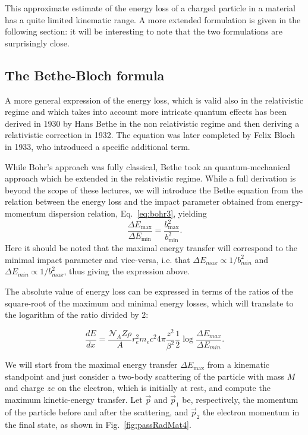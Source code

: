 This approximate estimate of the energy loss of a charged particle in a material has a quite limited kinematic range. A more extended formulation is given in the following section: it will be interesting to note that the two formulations are surprisingly close.

\subsection{The Bethe-Bloch formula}
A more general expression of the energy loss, which is valid also in the relativistic regime and which takes into account more intricate quantum effects has been derived in 1930 by Hans Bethe in the non relativistic regime and then deriving a relativistic correction in 1932. The equation was later completed by Felix Bloch in 1933, who introduced a specific additional term. 

While Bohr's approach was fully classical, Bethe took an quantum-mechanical approach which he extended in the relativistic regime. While a full derivation is beyond the scope of these lectures, we will introduce the Bethe equation from the relation between the energy loss and the impact parameter obtained  from energy-momentum dispersion relation, Eq.~\eqref{eq:bohr3}, yielding
\[ \frac{\Delta E_\text{max}}{\Delta E_\text{min}} =  \frac{b_\text{max}^2}{b_\text{min}^2}.\]
Here it should be noted that the maximal energy transfer will correspond to the minimal impact parameter and vice-versa,  i.e. that \(\Delta E_{max} \propto 1/b_{min}^2\) and \(\Delta E_{min} \propto 1/b_{max}^2\), thus giving the expression above.

The absolute value of energy loss can be expressed in terms of the ratios of the square-root of the maximum and minimal energy losses, which will translate to the logarithm of the ratio divided by $2$: 

\[\frac{dE}{dx} = \frac{\mathcal{N}_A Z \rho}{A} r_e^2 m_e c^2 4\pi
  \frac{z^2}{\beta^2} \frac{1}{2} \log \frac{\Delta E_{max}}{\Delta E_{min}}. \]

We will start from the maximal energy transfer $\Delta E_\text{max}$ from a kinematic standpoint and just consider a two-body scattering of the particle with mass $M$ and charge $ze$ on the electron, which is initially at rest, and compute the maximum kinetic-energy transfer. Let
$\vec{p}$ and $\vec{p}_1$ be, respectively, the momentum of the
particle before and after the scattering, and $\vec{p}_2$ the electron
momentum in the final state, as shown in Fig.~\ref{fig:passRadMat4}.

